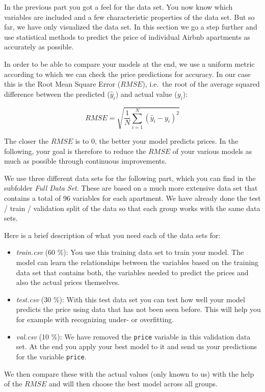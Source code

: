 \documentclass[
  11pt,
]{book}
\begin{document}
In the previous part you got a feel for the data set. You now know which variables are included and a few characteristic properties of the data set. But so far, we have only visualized the data set. In this section we go a step further and use statistical methods to predict the price of individual Airbnb apartments as accurately as possible.

In order to be able to compare your models at the end, we use a uniform metric according to which we can check the price predictions for accuracy. In our case this is the Root Mean Square Error (\(RMSE\)), i.e.~the root of the average squared difference between the predicted (\(\hat{y}_i\)) and actual value (\(y_i\)):

\[ RMSE = \sqrt{\frac{1}{N}\sum_{i=1}^{N}{(\hat{y}_i-y_i)^2}} \]

The closer the \(RMSE\) is to 0, the better your model predicts prices. In the following, your goal is therefore to reduce the \(RMSE\) of your various models as much as possible through continuous improvements.

We use three different data sets for the following part, which you can find in the subfolder \emph{Full Data Set}. These are based on a much more extensive data set that contains a total of 96 variables for each apartment. We have already done the test / train / validation split of the data so that each group works with the same data sets.

Here is a brief description of what you need each of the data sets for:

\begin{itemize}
\item
  \emph{train.csv} (60 \%): You use this training data set to train your model. The model can learn the relationships between the variables based on the training data set that contains both, the variables needed to predict the prices and also the actual prices themselves.
\item
  \emph{test.csv} (30 \%): With this test data set you can test how well your model predicts the price using data that has not been seen before. This will help you for example with recognizing under- or overfitting.
\item
  \emph{val.csv} (10 \%): We have removed the \texttt{price} variable in this validation data set. At the end you apply your best model to it and send us your predictions for the variable \texttt{price}.
\end{itemize}

We then compare these with the actual values (only known to us) with the help of the \(RMSE\) and will then choose the best model across all groups.
\end{document}
